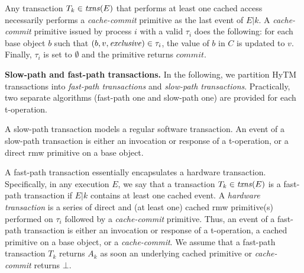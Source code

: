 Any transaction $T_k \in \ms{txns}(E)$ that performs at least one cached access necessarily performs a \emph{cache-commit} primitive as the last event of $E|k$. 
A \emph{cache-commit} primitive issued by process $i$ with
a valid $\tau_i$ does the following: for each base object $b$ such that $(b,v,\mathit{exclusive}) \in \tau_i$, the value of $b$ in $C$ is updated to $v$. 
Finally, $\tau_i$ is set to $\emptyset$ and the primitive 
returns $\textit{commit}$. 

\vspace{1mm}\noindent\textbf{Slow-path and fast-path transactions.}
In the following, we partition HyTM transactions into \emph{fast-path transactions} and \emph{slow-path transactions}.
Practically, two separate algorithms (fast-path one and slow-path one) 
are provided for each t-operation. 

A slow-path transaction models a regular software transaction.
An event of a slow-path transaction is either an invocation or response of a t-operation, or
a direct rmw primitive on a base object. 

A fast-path transaction essentially encapsulates a hardware transaction. Specifically, in any execution $E$,
we say that a transaction $T_k\in \ms{txns}(E)$ is a fast-path transaction if $E|k$ contains at least one cached event.
A \emph{hardware transaction} is a series of direct and (at least one) cached rmw primitive(s) performed on $\tau_i$ followed by
a \emph{cache-commit} primitive. 
Thus, an event of a fast-path transaction is either an invocation or response of a t-operation, 
a cached primitive on a base object, or a \emph{cache-commit}.
We assume that a fast-path transaction $T_k$ returns $A_k$
as soon an underlying cached primitive or \emph{cache-commit} returns $\bot$. 
%
%